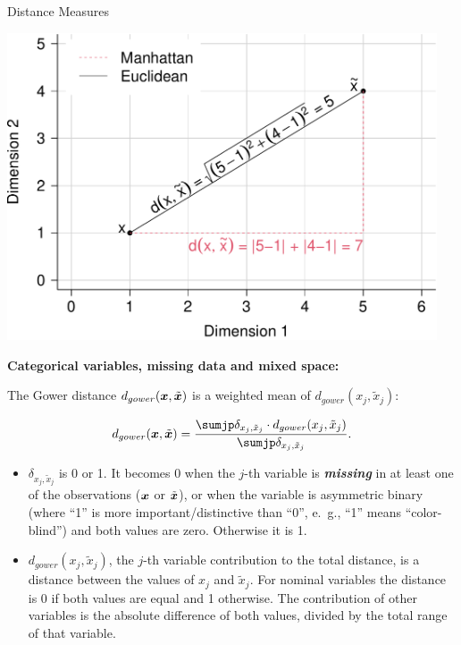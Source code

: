\documentclass[11pt,compress,t,notes=noshow, xcolor=table]{beamer}
\newenvironment{knitrout}{}{} %
\begin{document}
\begin{vbframe}{Distance Measures}
\begin{knitrout}
{\centering \includegraphics[width=0.955\textwidth,height=.75\textheight]{figure/reg_knn_2} 

}



\end{knitrout}

\framebreak

\textbf{Categorical variables, missing data and mixed space:}

The Gower distance \(d_{gower}(\bm{x}, \tilde{\bm{x}})\) is a weighted mean of \(d_{gower}(x_j,\tilde{x}_j)\):

$$d_{gower}(\xv, \tilde{\xv}) = \frac{\sumjp \delta_{x_j,\tilde{x}_j} \cdot d_{gower}(x_j,\tilde{x}_j)}{
\sumjp \delta_{x_j,\tilde{x}_j}}.
$$

\begin{itemize}

  \item \(\delta_{x_j,\tilde{x}_j}\) is 0 or 1. It becomes 0
  when the $j$-th variable is \textbf{\textit{missing}} in at least one of the observations ($\bm{x}$ or $\tilde{\bm{x}}$),
  or when the variable is asymmetric binary (where \enquote{1} is more
  important/distinctive than \enquote{0}, e.~g., \enquote{1} means \enquote{color-blind}) and both values are zero. Otherwise it is 1.
  \item \(d_{gower}(x_j,\tilde{x}_j)\), the $j$-th variable contribution to the
  total distance, is a distance between the values of $x_j$ and $\tilde{x}_j$.
  For nominal variables the distance is 0 if both values are equal and 1 otherwise.
  The contribution of other variables is the absolute difference of
  both values, divided by the total range of that variable.


\end{itemize}
\end{vbframe}
\end{document}
